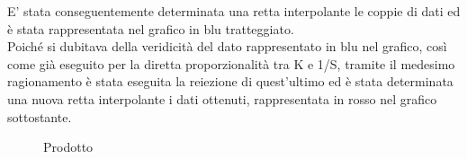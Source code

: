 \documentclass[a4paper,11pt,oneside]{article}
\begin{document}
E' stata conseguentemente determinata una retta interpolante le coppie di dati ed è stata rappresentata nel grafico in blu tratteggiato.\\
Poiché si dubitava della veridicità del dato rappresentato in blu nel grafico, così come già eseguito per la diretta proporzionalità tra K e 1/S, tramite il medesimo ragionamento è stata eseguita la reiezione di quest'ultimo ed è stata determinata una nuova retta interpolante i dati ottenuti, rappresentata in rosso nel grafico sottostante.

\begin{figure}[h!]
    \centering
        \label{fig:prodotto}
        \caption{Prodotto}
\end{figure}
\end{document}
